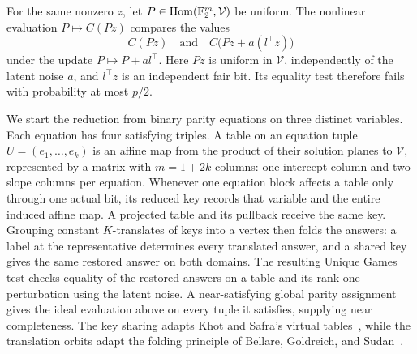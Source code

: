 For the same nonzero \(z\), let \(P\in\operatorname{Hom}(\mathbb F_2^m,\mathcal V)\) be
uniform. The nonlinear evaluation \(P\mapsto C(Pz)\) compares the values
\[
 C(Pz)\quad\text{and}\quad C\bigl(Pz+a(l^\top z)\bigr)
\]
under the update \(P\mapsto P+a l^\top\). Here \(Pz\) is uniform in
\(\mathcal V\), independently of the latent noise \(a\), and
\(l^\top z\) is an independent fair bit. Its equality test therefore
fails with probability at most \(p/2\).

We start the reduction from binary parity equations on three distinct
variables. Each equation has four satisfying triples. A table on an equation
tuple \(U=(e_1,\ldots,e_k)\) is an affine map from the product of their
solution planes to \(\mathcal V\), represented by a matrix with
\(m=1+2k\) columns: one intercept column and two slope columns per
equation. Whenever one equation block affects a table only through one
actual bit, its reduced key records that variable and the entire induced
affine map. A projected table and its pullback receive the same key.
Grouping constant \(K\)-translates of keys into a vertex then folds the
answers: a label at the representative determines every translated
answer, and a shared key gives the same restored answer on both domains.
The resulting Unique Games test checks equality of the restored answers
on a table and its rank-one perturbation using the latent noise. A
near-satisfying global parity assignment gives the ideal evaluation above
on every tuple it satisfies, supplying near completeness. The key sharing
adapts Khot and Safra's virtual tables~\cite[Section~1.1]{KS13}, while the
translation orbits adapt the folding principle of Bellare, Goldreich,
and Sudan~\cite[Section~3.3]{BGS98}.

